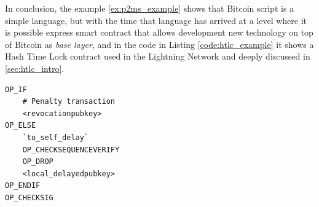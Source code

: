 In conclusion, the example \ref{ex:p2ms_example} shows that Bitcoin script is a simple
language, but with the time that language has arrived at a level where it is possible
express smart contract that allows development new technology on top of Bitcoin as \emph{base layer},
and in the code in Listing \ref{code:htlc_example} it shows a Hash Time Lock contract used in the Lightning Network 
and deeply discussed in \ref{sec:htlc_intro}.


\begin{lstlisting}[language=bitcoinscript, caption={Hash Time Lock contract first example.}, label={code:htlc_example}]
OP_IF
    # Penalty transaction
    <revocationpubkey>
OP_ELSE
    `to_self_delay`
    OP_CHECKSEQUENCEVERIFY
    OP_DROP
    <local_delayedpubkey>
OP_ENDIF
OP_CHECKSIG
\end{lstlisting}



